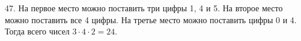 47. На первое место можно поставить три цифры 1, 4 и 5. На второе место можно поставить все 4 цифры. На третье место можно поставить цифры 0 и 4. Тогда всего чисел $3\cdot4\cdot2=24.$\\
